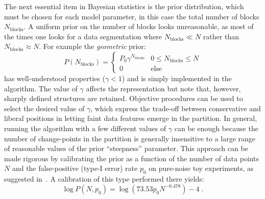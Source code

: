 The next essential item in Bayesian statistics is the prior distribution, which must be
chosen for each model parameter, in this case the total number of blocks
$N_\text{blocks}$. A uniform prior on the number of blocks looks unreasonable, as most of
the times one looks for a data segmentation where $N_\text{blocks} \ll N$ rather
than $N_\text{blocks} \approx N$. For example the \emph{geometric} prior:
\[
  P(N_\text{blocks}) =
  \begin{cases}
    P_0\gamma^{N_\text{blocks}} & 0 \le N_\text{blocks} \le N \\
    0                           & \text{else}
  \end{cases}
\]
has well-understood properties ($\gamma < 1$) and is simply implemented in the algorithm.
The value of $\gamma$ affects the representation but note that, however, sharply defined
structures are retained. Objective procedures can be used to select the desired value of
$\gamma$, which express the trade-off between conservative and liberal positions in
letting faint data features emerge in the partition. In general, running the algorithm
with a few different values of $\gamma$ can be enough because the number of change-points
in the partition is generally insensitive to a large range of reasonable values of the
prior ``steepness'' parameter. This approach can be made rigorous by calibrating the prior
as a function of the number of data points $N$ and the false-positive (type-I error) rate
$p_0$ on pure-noise toy experiments, as suggested in~\cite{Scargle2012}. A calibration of
this type performed there yields:
\[
  \log P(N, p_0) = \log(73.53 p_0 N^{-0.478}) - 4 \;.
\]


